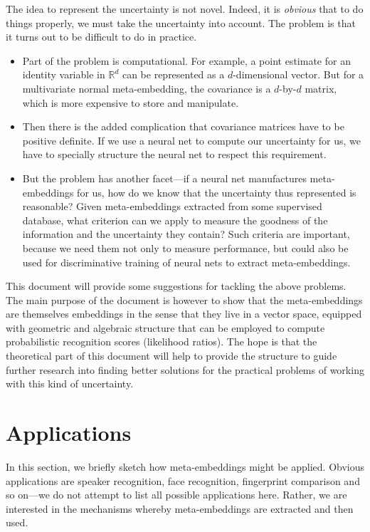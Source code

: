 \documentclass[a4paper,oneside,12pt,english]{report}
\def\R{\mathbb{R}}
\begin{document}
The idea to represent the uncertainty is not novel. Indeed, it is \emph{obvious} that to do things properly, we must take the uncertainty into account. The problem is that it turns out to be difficult to do in practice. 
\begin{itemize}
	\item Part of the problem is computational. For example, a point estimate for an identity variable in $\R^d$ can be represented as a $d$-dimensional vector. But for a multivariate normal meta-embedding, the covariance is a $d$-by-$d$ matrix, which is more expensive to store and manipulate. 
	\item Then there is the added complication that covariance matrices have to be positive definite. If we use a neural net to compute our uncertainty for us, we have to specially structure the neural net to respect this requirement. 
	\item But the problem has another facet---if a neural net manufactures meta-embeddings for us, how do we know that the uncertainty thus represented is reasonable? Given meta-embeddings extracted from some supervised database, what criterion can we apply to measure the goodness of the information and the uncertainty they contain? Such criteria are important, because we need them not only to measure performance, but could also be used for discriminative training of neural nets to extract meta-embeddings.
\end{itemize}
This document will provide some suggestions for tackling the above problems.\\ 

\noindent The main purpose of the document is however to show that the meta-embeddings are themselves embeddings in the sense that they live in a vector space, equipped with geometric and algebraic structure that can be employed to compute probabilistic recognition scores (likelihood ratios). The hope is that the theoretical part of this document will help to provide the structure to guide further research into finding better solutions for the practical problems of working with this kind of uncertainty.    

\section{Applications}
In this section, we briefly sketch how meta-embeddings might be applied. Obvious applications are speaker recognition, face recognition, fingerprint comparison and so on---we do not attempt to list all possible applications here. Rather, we are interested in the mechanisms whereby meta-embeddings are extracted and then used. 
\end{document}
